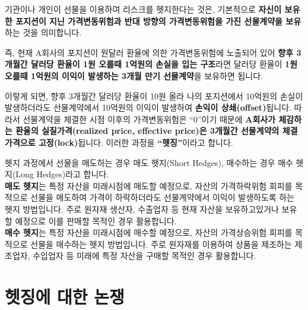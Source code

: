 \documentclass[
  letterpaper,
  DIV=11,
  numbers=noendperiod]{scrreprt}
\begin{document}
기관이나 개인이 선물을 이용하여 리스크를 헷지한다는 것은, 기본적으로
\textbf{자신이 보유한 포지션이 지닌 가격변동위험과 반대 방향의
가격변동위험을 가진 선물계약을 보유}하는 것을 의미합니다.

즉, 현재 A회사의 포지션이 원달러 환율에 의한 가격변동위험에 노출되어
있어 \textbf{향후 3개월간 달러당 환율이 1원 오를때 1억원의 손실을 입는
구조}라면 달러당 환율이 \textbf{1원 오를때 1억원의 이익이 발생하는 3개월
만기 선물계약}을 보유하면 됩니다.

이렇게 되면, 향후 3개월간 달러당 환율이 10원 올라 나의 포지션에서
10억원의 손실이 발생하더라도 선물계약에서 10억원의 이익이 발생하여
\textbf{손익이 상쇄(offset)}됩니다. 따라서 선물계약을 체결한 시점 이후의
가격변동위험은 ``0''이기 때문에 \textbf{A회사가 체감하는 환율의
실질가격(realized price, effective price)은 3개월간 선물계약의
체결가격으로 고정(lock)}됩니다. 이러한 과정을 \textbf{``헷징''}이라고
합니다.

\begin{tcolorbox}[enhanced jigsaw, titlerule=0mm, bottomtitle=1mm, left=2mm, title=\textcolor{quarto-callout-tip-color}{\faLightbulb}\hspace{0.5em}{매도 헷지 vs.~매수 헷지}, toptitle=1mm, bottomrule=.15mm, colframe=quarto-callout-tip-color-frame, breakable, opacityback=0, rightrule=.15mm, opacitybacktitle=0.6, coltitle=black, colback=white, arc=.35mm, colbacktitle=quarto-callout-tip-color!10!white, toprule=.15mm, leftrule=.75mm]

헷지 과정에서 선물을 매도하는 경우 매도 헷지(Short Hedges), 매수하는
경우 매수 헷지(Long Hedges)라고 합니다.\\
\textbf{매도 헷지}는 특정 자산을 미래시점에 매도할 예정으로, 자산의
가격하락위험 회피를 목적으로 선물을 매도하여 가격이 하락하더라도
선물계약에서 이익이 발생하도록 하는 헷지 방법입니다. 주로 원자재 생산자,
수출업자 등 현재 자산을 보유하고있거나 보유할 예정으로 이를 판매할
목적인 경우 활용합니다.\\
\textbf{매수 헷지}는 특정 자산을 미래시점에 매수할 예정으로, 자산의
가격상승위험 회피를 목적으로 선물을 매수하는 헷지 방법입니다. 주로
원자재를 이용하여 상품을 제조하는 제조업자, 수입업자 등 미래에 특정
자산을 구매할 목적인 경우 활용합니다.

\end{tcolorbox}

\section*{헷징에 대한
논쟁}\label{uxd5f7uxc9d5uxc5d0-uxb300uxd55c-uxb17cuxc7c1}
\end{document}
